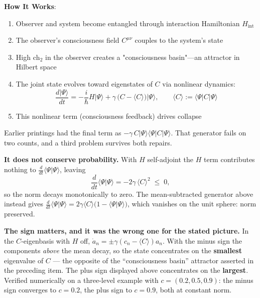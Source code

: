 \begin{level3}
\textbf{How It Works}:

\begin{enumerate}
\item Observer and system become entangled through interaction Hamiltonian $H_{\text{int}}$

\item The observer's consciousness field $C^{\mu\nu}$ couples to the system's state

\item High $\text{ch}_2$ in the observer creates a "consciousness basin"---an attractor in Hilbert space

\item The joint state evolves toward eigenstates of $C$ via nonlinear dynamics:
\begin{equation}
\frac{d|\Psi\rangle}{dt} = -\frac{i}{\hbar}H|\Psi\rangle
  + \gamma\,\bigl(C - \langle C\rangle\bigr)|\Psi\rangle,
\qquad \langle C\rangle := \langle\Psi|C|\Psi\rangle
\end{equation}

\item This nonlinear term (consciousness feedback) drives collapse
\end{enumerate}

\begin{remark}
\label{rem:collapse-generator-2026-10-03}
Earlier printings had the final term as
$-\gamma\,C|\Psi\rangle\langle\Psi|C|\Psi\rangle$. That generator fails on two
counts, and a third problem survives both repairs.

\textbf{It does not conserve probability.} With $H$ self-adjoint the $H$ term
contributes nothing to $\tfrac{d}{dt}\langle\Psi|\Psi\rangle$, leaving
\[
\frac{d}{dt}\langle\Psi|\Psi\rangle = -2\gamma\,\langle C\rangle^2 \;\leq\; 0,
\]
so the norm decays monotonically to zero. The mean-subtracted generator above
instead gives
$\tfrac{d}{dt}\langle\Psi|\Psi\rangle = 2\gamma\langle C\rangle\bigl(1 - \langle\Psi|\Psi\rangle\bigr)$,
which vanishes on the unit sphere: norm preserved.

\textbf{The sign matters, and it was the wrong one for the stated picture.} In
the $C$-eigenbasis with $H$ off, $\dot a_n = \pm\gamma(c_n - \langle C\rangle)a_n$.
With the minus sign the components \emph{above} the mean decay, so the state
concentrates on the \textbf{smallest} eigenvalue of $C$ --- the opposite of the
``consciousness basin'' attractor asserted in the preceding item. The plus sign
displayed above concentrates on the \textbf{largest}. Verified numerically on a
three-level example with $c = (0.2, 0.5, 0.9)$: the minus sign converges to
$c = 0.2$, the plus sign to $c = 0.9$, both at constant norm.


\end{remark}
\end{level3}
